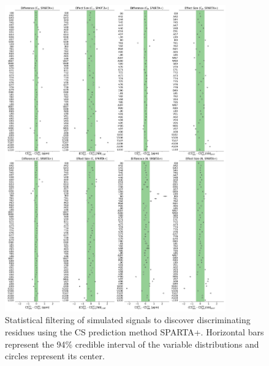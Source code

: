 \documentclass[%
 aip,
 amsmath,amssymb,
 preprint,%
]{revtex4-1}
\begin{document}
\begin{figure}[tbp]
	\includegraphics[width=0.85\textwidth]{figures_SI/statistical_filtering_skew_model_sparta_plus_all.png}
	 \caption{\scriptsize
 Statistical filtering of simulated signals to discover discriminating residues using the CS prediction method SPARTA+. Horizontal bars represent the 94\% credible interval of the variable distributions and circles represent its center. 
}
\label{SI_stat_filt_1}
\end{figure}
\end{document}
